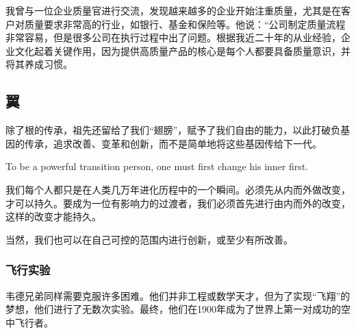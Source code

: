 我曾与一位企业质量官进行交流，发现越来越多的企业开始注重质量，尤其是在客户对质量要求非常高的行业，如银行、基金和保险等。他说：``公司制定质量流程非常容易，但是很多公司在执行过程中出了问题。根据我近二十年的从业经验，企业文化起着关键作用，因为提供高质量产品的核心是每个人都要具备质量意识，并将其养成习惯。

\hypertarget{ux7ffc}{%
\subsection{翼}\label{ux7ffc}}

除了根的传承，祖先还留给了我们``翅膀''，赋予了我们自由的能力，以此打破负基因的传承，追求改善、变革和创新，而不是简单地将这些基因传给下一代。

To be a powerful transition person, one must first change his inner
first.

我们每个人都只是在人类几万年进化历程中的一个瞬间。必须先从内而外做改变，才可以持久。要成为一位有影响力的过渡者，我们必须首先进行由内而外的改变，这样的改变才能持久。

当然，我们也可以在自己可控的范围内进行创新，或至少有所改善。

\hypertarget{ux98deux884cux5b9eux9a8c}{%
\subsubsection{飞行实验}\label{ux98deux884cux5b9eux9a8c}}

韦德兄弟同样需要克服许多困难。他们并非工程或数学天才，但为了实现``飞翔''的梦想，他们进行了无数次实验。最终，他们在1900年成为了世界上第一对成功的空中飞行者。

